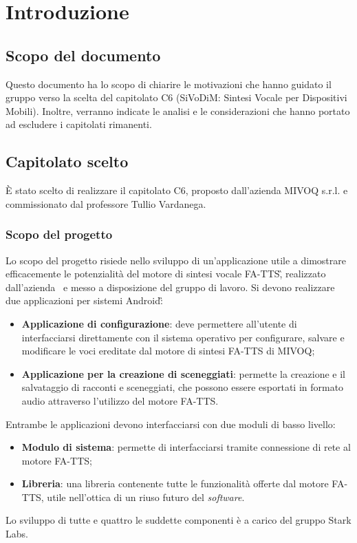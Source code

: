 \section{Introduzione}

\subsection{Scopo del documento}
Questo documento ha lo scopo di chiarire le motivazioni che hanno guidato il gruppo verso la scelta del capitolato C6 (SiVoDiM: Sintesi Vocale per Dispositivi Mobili). Inoltre, verranno indicate le analisi e le considerazioni che hanno portato ad escludere i capitolati rimanenti.

\subsection{Capitolato scelto}
È stato scelto di realizzare il capitolato C6, proposto dall'azienda MIVOQ s.r.l. e commissionato dal professore Tullio Vardanega.

\subsubsection{Scopo del progetto}
Lo scopo del progetto risiede nello sviluppo di un'applicazione utile a dimostrare efficacemente
le potenzialità del motore di sintesi vocale FA-TTS\G, realizzato dall'azienda \AZIENDA\ e messo a disposizione del gruppo di lavoro. Si devono realizzare due applicazioni per sistemi Android\G:
\begin{itemize}
	\item \textbf{Applicazione di configurazione}: deve permettere all'utente di interfacciarsi direttamente con il sistema operativo per configurare, salvare e modificare le voci ereditate dal motore di sintesi FA-TTS di MIVOQ;
	\item \textbf{Applicazione per la creazione di sceneggiati}: permette la creazione e il salvataggio di racconti e sceneggiati, che possono essere esportati in formato audio attraverso l'utilizzo del motore FA-TTS.
\end{itemize}
Entrambe le applicazioni devono interfacciarsi con due moduli di basso livello:
\begin{itemize}
	\item \textbf{Modulo di sistema}: permette di interfacciarsi tramite connessione di rete al motore FA-TTS;
	\item \textbf{Libreria}: una libreria contenente tutte le funzionalità offerte dal motore FA-TTS, utile nell'ottica di un riuso futuro del \textit{software}.
\end{itemize} 
Lo sviluppo di tutte e quattro le suddette componenti è a carico del gruppo Stark Labs.

